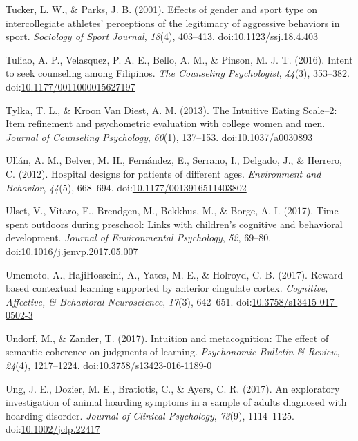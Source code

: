 \documentclass[english,man]{apa6}
\theoremstyle{definition}
\theoremstyle{definition}
\theoremstyle{definition}
\theoremstyle{remark}
\begin{document}
\hypertarget{ref-Tucker2001}{}
Tucker, L. W., \& Parks, J. B. (2001). Effects of gender and sport type
on intercollegiate athletes' perceptions of the legitimacy of aggressive
behaviors in sport. \emph{Sociology of Sport Journal}, \emph{18}(4),
403--413.
doi:\href{https://doi.org/10.1123/ssj.18.4.403}{10.1123/ssj.18.4.403}

\hypertarget{ref-Tuliao2016}{}
Tuliao, A. P., Velasquez, P. A. E., Bello, A. M., \& Pinson, M. J. T.
(2016). Intent to seek counseling among Filipinos. \emph{The Counseling
Psychologist}, \emph{44}(3), 353--382.
doi:\href{https://doi.org/10.1177/0011000015627197}{10.1177/0011000015627197}

\hypertarget{ref-Tylka2013}{}
Tylka, T. L., \& Kroon Van Diest, A. M. (2013). The Intuitive Eating
Scale--2: Item refinement and psychometric evaluation with college women
and men. \emph{Journal of Counseling Psychology}, \emph{60}(1),
137--153. doi:\href{https://doi.org/10.1037/a0030893}{10.1037/a0030893}

\hypertarget{ref-Ullan2012}{}
Ullán, A. M., Belver, M. H., Fernández, E., Serrano, I., Delgado, J., \&
Herrero, C. (2012). Hospital designs for patients of different ages.
\emph{Environment and Behavior}, \emph{44}(5), 668--694.
doi:\href{https://doi.org/10.1177/0013916511403802}{10.1177/0013916511403802}

\hypertarget{ref-Ulset2017}{}
Ulset, V., Vitaro, F., Brendgen, M., Bekkhus, M., \& Borge, A. I.
(2017). Time spent outdoors during preschool: Links with children's
cognitive and behavioral development. \emph{Journal of Environmental
Psychology}, \emph{52}, 69--80.
doi:\href{https://doi.org/10.1016/j.jenvp.2017.05.007}{10.1016/j.jenvp.2017.05.007}

\hypertarget{ref-Umemoto2017}{}
Umemoto, A., HajiHosseini, A., Yates, M. E., \& Holroyd, C. B. (2017).
Reward-based contextual learning supported by anterior cingulate cortex.
\emph{Cognitive, Affective, \& Behavioral Neuroscience}, \emph{17}(3),
642--651.
doi:\href{https://doi.org/10.3758/s13415-017-0502-3}{10.3758/s13415-017-0502-3}

\hypertarget{ref-Undorf2016}{}
Undorf, M., \& Zander, T. (2017). Intuition and metacognition: The
effect of semantic coherence on judgments of learning. \emph{Psychonomic
Bulletin \& Review}, \emph{24}(4), 1217--1224.
doi:\href{https://doi.org/10.3758/s13423-016-1189-0}{10.3758/s13423-016-1189-0}

\hypertarget{ref-Ung2017}{}
Ung, J. E., Dozier, M. E., Bratiotis, C., \& Ayers, C. R. (2017). An
exploratory investigation of animal hoarding symptoms in a sample of
adults diagnosed with hoarding disorder. \emph{Journal of Clinical
Psychology}, \emph{73}(9), 1114--1125.
doi:\href{https://doi.org/10.1002/jclp.22417}{10.1002/jclp.22417}
\end{document}
